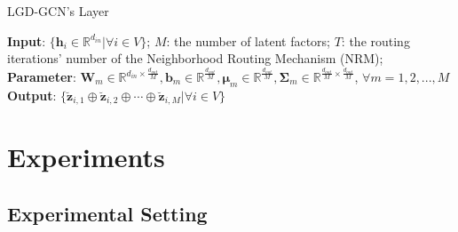 \documentclass[accepted]{uai2021} %
\begin{document}
\begin{algorithm}[t]
\caption{\small{LGD-GCN's Layer}}\label{alg:lgd_gcn}
\SetAlgoLined
\small{
\textbf{Input}: $\{\mathbf{h}_i \in \mathbb{R}^{d_{in}}|\forall i \in V\}$; $M$: the number of latent factors; $T$: the routing iterations' number of the Neighborhood Routing Mechanism (NRM); \\
\textbf{Parameter}: $\mathbf{W}_m \in \mathbb{R}^{d_{in} \times \frac{d_{out}}{M}}, \mathbf{b}_m \in \mathbb{R}^{\frac{d_{out}}{M}}, \boldsymbol{\mu}_m \in \mathbb{R}^{\frac{d_{out}}{M}}, \boldsymbol{\Sigma}_m \in \mathbb{R}^{\frac{d_{out}}{M} \times \frac{d_{out}}{M}}$, $\forall m = 1,2,...,M$ \\
\textbf{Output}: $\{\breve{\mathbf{z}}_{i, 1} \oplus \breve{\mathbf{z}}_{i, 2} \oplus \cdots \oplus \breve{\mathbf{z}}_{i, M} | \forall i \in V\}$
}
\end{algorithm}

\section{Experiments}\label{sec:experiment}

\subsection{Experimental Setting}\label{sec:exp_set}
\end{document}
